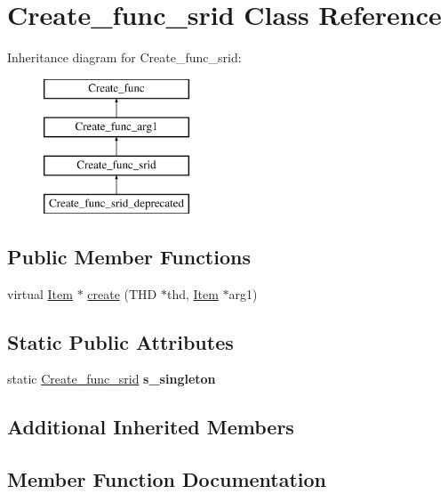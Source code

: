 \hypertarget{classCreate__func__srid}{}\section{Create\+\_\+func\+\_\+srid Class Reference}
\label{classCreate__func__srid}
Inheritance diagram for Create\+\_\+func\+\_\+srid\+:\begin{figure}[H]
\begin{center}
\leavevmode
\includegraphics[height=4.000000cm]{classCreate__func__srid}
\end{center}
\end{figure}
\subsection*{Public Member Functions}
\begin{DoxyCompactItemize}
\item 
virtual \mbox{\hyperlink{classItem}{Item}} $\ast$ \mbox{\hyperlink{classCreate__func__srid_a178db6ee641c938de060d692e426ac18}{create}} (T\+HD $\ast$thd, \mbox{\hyperlink{classItem}{Item}} $\ast$arg1)
\end{DoxyCompactItemize}
\subsection*{Static Public Attributes}
\begin{DoxyCompactItemize}
\item 
\mbox{\label{classCreate__func__srid_ab7d2f5a3d957d41f42c332b60cb2f456}} 
static \mbox{\hyperlink{classCreate__func__srid}{Create\+\_\+func\+\_\+srid}} {\bfseries s\+\_\+singleton}
\end{DoxyCompactItemize}
\subsection*{Additional Inherited Members}


\subsection{Member Function Documentation}
\mbox{\label{classCreate__func__srid_a178db6ee641c938de060d692e426ac18}} 
